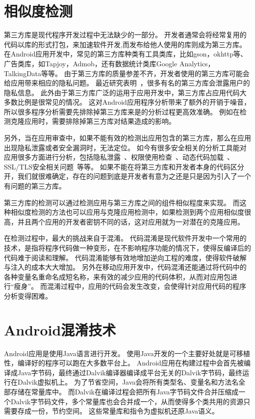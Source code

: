 \section{相似度检测}
\label{sec:sim-detect}

第三方库是现代程序开发过程中无法缺少的一部分。
开发者通常会将经常复用的代码以库的形式打包，来加速软件开发,而发布给他人使用的库则成为第三方库。
在Android应用开发中，常见的第三方库种类有工具类库，比如gson，okhttp等、广告类库，如Tapjoy，Admob，还有数据统计类库Google Analytics，TalkingData等等。
由于第三方库的质量参差不齐，开发者使用的第三方库可能会给应用带来相应的隐私问题。
最近研究表明~\supercite{enck:androidsec,grace2012unsafe}，很多有名的第三方库会泄露用户的隐私信息。
此外由于第三方库广泛的运用于应用开发中，第三方库占应用代码大多数比例是很常见的情况。
这对Android应用程序分析带来了额外的开销于噪音，所以很多程序分析需要先排除掉第三方库来是的分析过程更高效准确。
例如在检测克隆应用时，需要排除掉第三方库对结果造成的影响。

另外，当在应用审查中，如果不能有效的检测出应用包含的第三方库，那么在应用出现隐私泄露或者安全漏洞时，无法定位。
如今有很多安全相关的分析工具能对应用很多方面进行分析，包括隐私泄露~\supercite{androidleaks, flowdroid, amandroid, droidsafe,rdroid}、权限使用检查~\supercite{remystified}、动态代码加载~\supercite{execute}、SSL/TLS安全相关问题~\supercite{topin, eve}等等。
如果不能在将第三方库和开发者本身的代码区分开，我们就很难确定，存在的问题到底是开发者有意为之还是只是因为引入了一个有问题的第三方库。

第三方库的检测可以通过检测应用与第三方库之间的组件相似程度来实现。
而这种相似度检测的方法也可以应用与克隆应用检测中，如果检测到两个应用相似度很高，并且两个应用的开发者密钥不同的话，这对应用就为一对潜在的克隆应用。

在检测过程中，最大的挑战来自于混淆。
代码混淆是现代软件开发中一个常用的技术，是指将程序代码做一种变形，在不影响程序功能的情况下，使得反编译后的代码难于阅读和理解。
代码混淆能够有效地增加逆向工程的难度，使得软件破解与注入的成本大大增加。
另外在移动应用开发中，代码混淆还能通过将代码中的各种变量名重命名成短名称，来有效的减少应用的代码体积，从而对应用包进行“瘦身”。
而混淆过程中，应用的代码会发生改变，会使得针对应用代码的程序分析变得困难。

\section{Android混淆技术}
\label{sec:obfuscation}

Android应用是使用Java语言进行开发。
使用Java开发的一个主要好处就是可移植性，编译好的程序可以跑在大多数平台上。
Android应用在构建过程中会首先被编译成Java字节码，最终通过Dalvik编译器编译成平台无关的Dalvik字节码，最终运行在Dalvik虚拟机上。
为了节省空间，Java会将所有类型名、变量名和方法名全部存储在常量库中。
而Dalvik在编译过程会把所有Java字节码文件合并压缩成一个Dalvik字节码文件，多个常量库也会合并成一个，从而使得多个类共用的资源只需要存成一份，节约空间。
这些常量库和指令为虚拟机还原Java语义。

